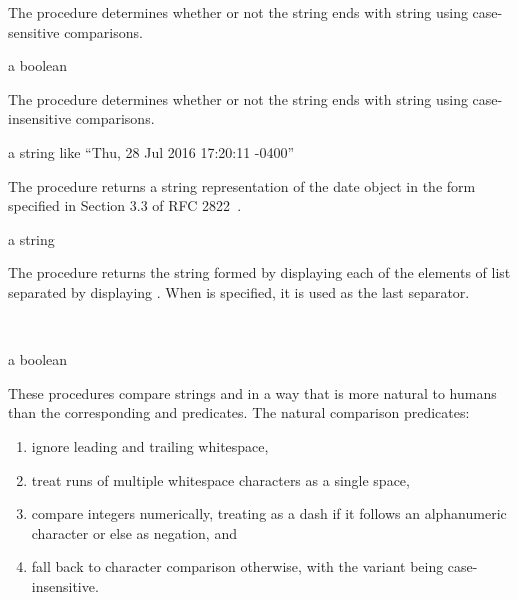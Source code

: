 The  procedure determines whether or not the string
 ends with string  using case-sensitive comparisons.

\begin{procedure}
\end{procedure}
\returns{} a boolean

The  procedure determines whether or not the
string  ends with string  using case-insensitive
comparisons.

\begin{procedure}
\end{procedure}
\returns{} a string like ``Thu, 28 Jul 2016 17:20:11 -0400''

The  procedure returns a string representation of
the date object  in the form specified in Section 3.3 of RFC
2822~\cite{RFC2822}.

\begin{procedure}
\end{procedure}
\returns{} a string

The  procedure returns the string formed by displaying each
of the elements of list  separated by displaying
. When  is specified, it is used as
the last separator.

\begin{procedure}
  \\
  \strut
\end{procedure}
\returns{} a boolean

These procedures compare strings  and  in a way that is
more natural to humans than the corresponding
 and  predicates.
The natural comparison predicates:
\begin{enumerate}
 \item ignore leading and trailing whitespace,
 \item treat runs of multiple whitespace characters as a single space,
 \item compare integers numerically, treating \code{-} as a dash
   if it follows an alphanumeric character or else as negation, and
 \item fall back to character comparison otherwise, with the 
   variant being case-insensitive.
\end{enumerate}

